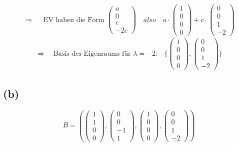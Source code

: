 \documentclass{article} %
\begin{document}
     \[
       \Rightarrow \quad \text{ EV haben die Form }  \begin{pmatrix}
         a \\ 0 \\ c \\ -2c 
      \end{pmatrix} \quad 
        also \quad  a \cdot  \begin{pmatrix}
         1 \\ 0 \\ 0 \\ 0 
      \end{pmatrix} + c \cdot  \begin{pmatrix}
         0 \\ 0 \\ 1 \\ -2 
      \end{pmatrix}
     \]
     \begin{align*}
       \Rightarrow  \quad \text{Basis des Eigenraums für } \lambda = -2 : & \Biggl\{ \begin{pmatrix}
         1 \\ 0 \\ 0 \\ 0 
      \end{pmatrix}, \begin{pmatrix}
         0 \\ 0 \\ 1 \\ -2 
      \end{pmatrix}   \Biggr\}
     \end{align*}
 \subsection*{(b)}
\[
B = ( \begin{pmatrix}
         1 \\ 1 \\ 0 \\ 0 
      \end{pmatrix}, \begin{pmatrix}
         0 \\ 0\\ -1 \\ 1
      \end{pmatrix}, \begin{pmatrix}
         1 \\ 0 \\ 0 \\ 0
      \end{pmatrix}  , \begin{pmatrix}
           0 \\ 0 \\ 1 \\ -2
      \end{pmatrix}  )
\]
\end{document}
